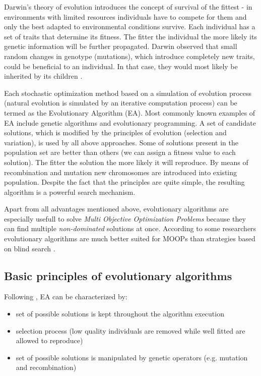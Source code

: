 Darwin's theory of evolution introduces the concept of survival of the fittest - in environments with limited resources individuals have to compete for them and
only the best adapted to environmental conditions survive.
Each individual has a set of traits that determine its fitness.
The fitter the individual the more likely its genetic information will be further propagated.
Darwin observed that small random changes in genotype (mutations), which introduce completely new traits, could be beneficial to an individual.
In that case, they would most likely be inherited by its children \cite{evo}.


Each stochastic optimization method based on a simulation of evolution process (natural evolution is simulated by an iterative computation process)
can be termed as the Evolutionary Algorithm (EA).
Most commonly known examples of EA include genetic algorithms and evolutionary programming.
A set of candidate solutions, which is modified by the principles of evolution (selection and variation), is used by all above approaches.
Some of solutions present in the population set are better than others (we can assign a fitness value to each solution).
The fitter the solution the more likely it will reproduce.
By means of recombination and mutation new chromosomes are introduced into existing population.
Despite the fact that the principles are quite simple, the resulting algorithm is a powerful search mechanism.  

Apart from all advantages mentioned above, evolutionary algorithms are especially usefull to solve \emph{Multi Objective Optimization Problems} because they
can find multiple \emph{non-dominated} solutions at once. 
According to some researchers evolutionary algorithms are much better suited for MOOPs than strategies based on blind search \cite{Phd}.

\subsection{Basic principles of evolutionary algorithms}

Following \cite{Phd}, EA can be characterized by:

\begin{itemize}
  \item set of possible solutions is kept throughout the algorithm execution
  \item selection process (low quality individuals are removed while well fitted are allowed to reproduce)
  \item set of possible solutions is manipulated by genetic operators (e.g. mutation and recombination)
\end{itemize}

